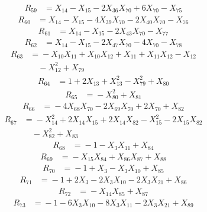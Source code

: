 \[\begin{aligned}
R_{59} &={}X_{14} - X_{15} - 2X_{36}X_{70} + 6X_{70} - X_{75}
\end{aligned}\]
\[\begin{aligned}
R_{60} &={}X_{14} - X_{15} - 4X_{39}X_{70} - 2X_{40}X_{70} - X_{76}
\end{aligned}\]
\[\begin{aligned}
R_{61} &={}X_{14} - X_{15} - 2X_{43}X_{70} - X_{77}
\end{aligned}\]
\[\begin{aligned}
R_{62} &={}X_{14} - X_{15} - 2X_{47}X_{70} - 4X_{70} - X_{78}
\end{aligned}\]
\[\begin{aligned}
R_{63} &={}-X_{10}X_{11} + X_{10}X_{12} + X_{11} + X_{11}X_{12} - X_{12}\\
&\quad{} - X_{12}^{2} + X_{79}
\end{aligned}\]
\[\begin{aligned}
R_{64} &={}1 + 2X_{13} + X_{13}^{2} - X_{79}^{2} + X_{80}
\end{aligned}\]
\[\begin{aligned}
R_{65} &={}-X_{80}^{2} + X_{81}
\end{aligned}\]
\[\begin{aligned}
R_{66} &={}-4X_{68}X_{70} - 2X_{69}X_{70} + 2X_{70} + X_{82}
\end{aligned}\]
\[\begin{aligned}
R_{67} &={}-X_{14}^{2} + 2X_{14}X_{15} + 2X_{14}X_{82} - X_{15}^{2} - 2X_{15}X_{82}\\
&\quad{} - X_{82}^{2} + X_{83}
\end{aligned}\]
\[\begin{aligned}
R_{68} &={}-1 - X_{3}X_{11} + X_{84}
\end{aligned}\]
\[\begin{aligned}
R_{69} &={}-X_{15}X_{84} + X_{86}X_{87} + X_{88}
\end{aligned}\]
\[\begin{aligned}
R_{70} &={}-1 + X_{3} - X_{3}X_{10} + X_{85}
\end{aligned}\]
\[\begin{aligned}
R_{71} &={}-1 + 2X_{3} - 2X_{3}X_{10} - 2X_{3}X_{21} + X_{86}
\end{aligned}\]
\[\begin{aligned}
R_{72} &={}-X_{14}X_{85} + X_{87}
\end{aligned}\]
\[\begin{aligned}
R_{73} &={}-1 - 6X_{3}X_{10} - 8X_{3}X_{11} - 2X_{3}X_{21} + X_{89}
\end{aligned}\]
